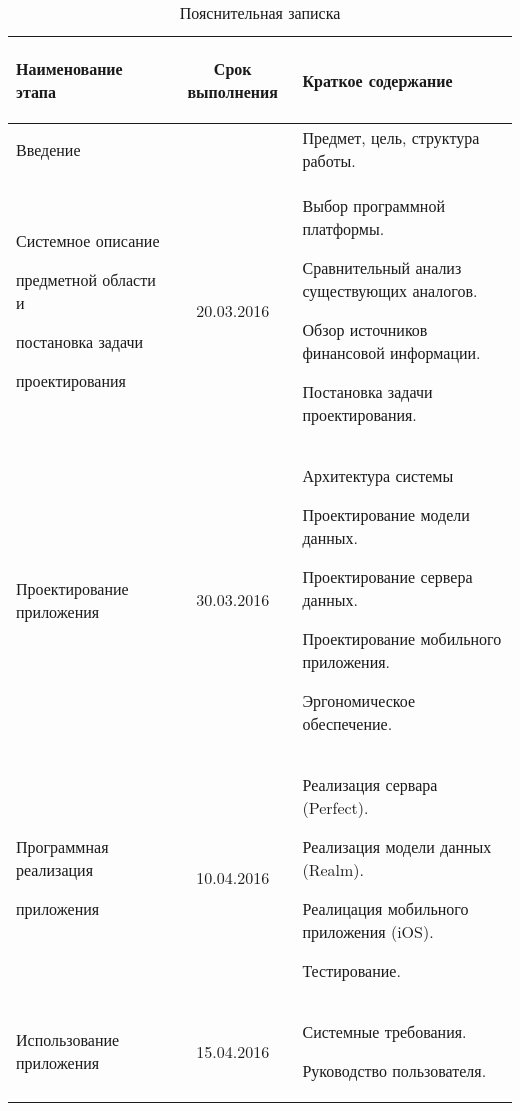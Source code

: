 \begin{table} [h!]
  \caption{
    Пояснительная записка
  }\label{tbl:plan_synopsis}
  \small{
    \begin{tabular}{| m{4.8cm} | c | m{7cm} |}
      \hline
      \begin{center} Наименование этапа \end{center}
      & Срок выполнения
      & \begin{center} Краткое содержание \end{center} \\
      \hline

      Введение
      &
      & Предмет, цель, структура работы. \\
      \hline

      Системное описание \par
      предметной области и \par
      постановка задачи \par
      проектирования
      & 20.03.2016
      & Выбор программной платформы. \par
        Сравнительный анализ существующих аналогов. \par
        Обзор источников финансовой информации. \par
        Постановка задачи проектирования. \\
      \hline

      Проектирование приложения
      & 30.03.2016
      & Архитектура системы \par
        Проектирование модели данных. \par
        Проектирование сервера данных. \par
        Проектирование мобильного приложения. \par
        Эргономическое обеспечение. \\
      \hline

      Программная реализация \par приложения
      & 10.04.2016
      & Реализация сервара (Perfect). \par
        Реализация модели данных (Realm). \par
        Реалицация мобильного приложения (iOS). \par
        Тестирование. \\
      \hline

      Использование приложения
      & 15.04.2016
      & Системные требования. \par
        Руководство пользователя. \\
      \hline


\end{tabular}}
\end{table}
